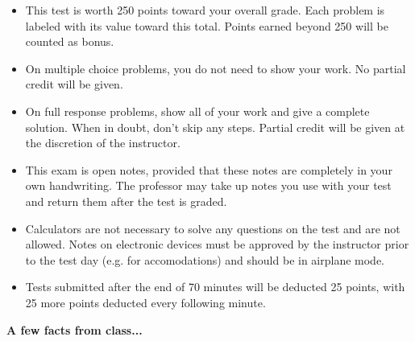 \documentclass[12pt]{exam}
\newcommand{\<}{\langle}
\renewcommand{\>}{\rangle}
\begin{document}
\begin{center}
\end{center}
\vspace{0.1in}

\vspace{12pt}

\begin{itemize}
  \item This test is worth 250 points toward your overall grade.
        Each problem is labeled with its value toward this total. Points
        earned beyond 250 will be counted as bonus.
  \item On multiple choice problems, you do not need to show your work. No
        partial credit will be given.
  \item On full response problems, show all of your work and give a
        complete solution. When in doubt, don't skip any steps. Partial
        credit will be given at the discretion of the instructor.
  \item This exam is open notes, provided that these notes are completely
        in your own handwriting. The professor may take up notes you use
        with your test and return them after the test is graded.
  \item Calculators are not necessary to solve any questions on the test and
        are not allowed.
        Notes on electronic devices must be approved by the instructor
        prior to the test day (e.g. for accomodations) and should be in
        airplane mode.
  \item Tests submitted after the end of 70 minutes will be deducted 25 points,
        with 25 more points deducted every following minute.
\end{itemize}

\newpage

\begin{center}
  \textbf{A few facts from class...}
\end{center}
\end{document}
